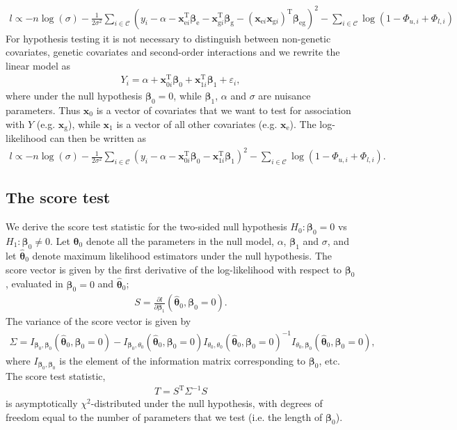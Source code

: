 \documentclass[10pt,a4paper]{article}
\def\bbeta{\bm{\beta}}
\def\bbetag{\bm{\beta}_{\text{g}}}
\def\bbetae{\bm{\beta}_{\text{e}}}
\def\bbetaeg{\bm{\beta}_{\text{eg}}}
\def\bxoi{\mathbf{x}_{0i}}
\def\bxni{\mathbf{x}_{1i}}
\def\bxgi{\mathbf{x}_{\text{g}i}}
\def\bxei{\mathbf{x}_{\text{e}i}}
\def\bxg{\mathbf{x}_{\text{g}}}
\def\bxe{\mathbf{x}_{\text{e}}}
\begin{document}
\begin{align*}
l \propto -n \log(\sigma) - \frac{1}{2 \sigma^2} \sum_{i \in \mathcal{C}} (y_i - \alpha - \bxei^{\text{T}} \bbetae - \bxgi^{\text{T}} \bbetag - (\bxei \bxgi)^{\text{T}} \bbetaeg )^2 
 - \sum_{i \in \mathcal{C}} \log\left( 1 - \Phi_{u,i} + \Phi_{l,i} \right)
\end{align*}
For hypothesis testing it is not necessary to distinguish between non-genetic covariates, genetic covariates and second-order interactions and we rewrite the linear model as 
\begin{align*}
Y_i = \alpha + \bxoi^{\text{T}} \bbeta_0 + \bxni^{\text{T}} \bbeta_1 + \varepsilon_i,
\end{align*}
where under the null hypothesis $\bbeta_0 = 0$, while $\bbeta_1$, $\alpha$ and $\sigma$ are nuisance parameters. Thus $\mathbf{x}_0$ is a vector of covariates that we want to test for association with $Y$ (e.g. $\bxg$), while $\mathbf{x}_{1}$ is a vector of all other covariates (e.g. $\bxe$). The log-likelihood can then be written as
\begin{align}
l \propto -n \log(\sigma) - \frac{1}{2 \sigma^2} \sum_{i \in \mathcal{C}} (y_i - \alpha - \bxoi^{\text{T}} \bbeta_0 - \bxni^{\text{T}} \bbeta_1)^2 
 - \sum_{i \in \mathcal{C}} \log\left( 1 - \Phi_{u,i} + \Phi_{l,i} \right).
\label{eq:ccloglik2}
\end{align}

\subsection{The score test}
We derive the score test statistic for the two-sided null hypothesis $H_0: \bbeta_0 = 0$ vs $H_1: \bbeta_0 \neq 0$. Let $\boldsymbol\theta_0$ denote all the parameters in the null model, $\alpha$, $\bbeta_1$ and $\sigma$, and let $\hat{\boldsymbol\theta}_0$ denote maximum likelihood estimators under the null hypothesis. The score vector is given by the first derivative of the log-likelihood with respect to $\bbeta_0$, evaluated in $\bbeta_0 = 0$ and $\hat{\boldsymbol\theta}_0$;
\begin{align*}
S = \frac{\partial l}{\partial \bbeta_1} (\hat{\boldsymbol\theta}_0, \bbeta_0 = 0).
\end{align*}
The variance of the score vector is given by
\begin{align*}
\Sigma = I_{\bbeta_0, \bbeta_0}(\hat{\boldsymbol\theta}_0, \bbeta_0 = 0) - I_{\bbeta_0, \theta_0}(\hat{\boldsymbol\theta}_0, \bbeta_0 = 0) I_{\theta_0, \theta_0}(\hat{\boldsymbol\theta}_0, \bbeta_0 = 0)^{-1} I_{\theta_0,\bbeta_0}(\hat{\boldsymbol\theta}_0, \bbeta_0 = 0),
\end{align*}
where $I_{\bbeta_0, \bbeta_0}$ is the element of the information matrix corresponding to $\bbeta_0$, etc. The score test statistic,
\begin{align*}
T = S^{\text{T}} \Sigma^{-1} S
\end{align*}
is asymptotically $\chi^2$-distributed under the null hypothesis, with degrees of freedom equal to the number of parameters that we test (i.e. the length of $\bbeta_0$).
\end{document}

